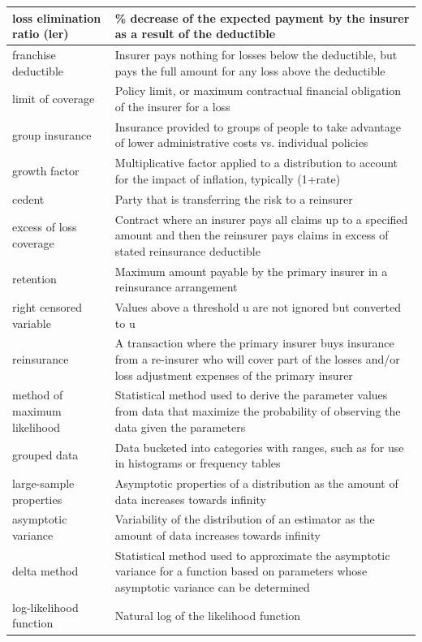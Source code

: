 \documentclass[
]{book}
\begin{document}
\begin{longtable}{>{\raggedright\arraybackslash}p{10em}|>{\raggedright\arraybackslash}p{30em}}
\hline
loss elimination ratio (ler) & \% decrease of the expected payment by the insurer as a result of the deductible\\
\hline
franchise deductible & Insurer pays nothing for losses below the deductible, but pays the full amount for any loss above the deductible\\
\hline
limit of coverage & Policy limit, or maximum contractual financial obligation of the insurer for a loss\\
\hline
group insurance & Insurance provided to groups of people to take advantage of lower administrative costs vs. individual policies\\
\hline
growth factor & Multiplicative factor applied to a distribution to account for the impact of inflation, typically (1+rate)\\
\hline
cedent & Party that is transferring the risk to a reinsurer\\
\hline
excess of loss coverage & Contract where an insurer pays all claims up to a specified amount and then the reinsurer pays claims in excess of stated reinsurance deductible\\
\hline
retention & Maximum amount payable by the primary insurer in a reinsurance arrangement\\
\hline
right censored variable & Values above a threshold u are not ignored but converted to u\\
\hline
reinsurance & A transaction where the primary insurer buys insurance from a re-insurer who will cover part of the losses and/or loss adjustment expenses of the primary insurer\\
\hline
method of maximum likelihood & Statistical method used to derive the parameter values from data that maximize the probability of observing the data given the parameters\\
\hline
grouped data & Data bucketed into categories with ranges, such as for use in histograms or frequency tables\\
\hline
large-sample properties & Asymptotic properties of a distribution as the amount of data increases towards infinity\\
\hline
asymptotic variance & Variability of the distribution of an estimator as the amount of data increases towards infinity\\
\hline
delta method & Statistical method used to approximate the asymptotic variance for a function based on parameters whose asymptotic variance can be determined\\
\hline
log-likelihood function & Natural log of the likelihood function\\

\end{longtable}
\end{document}
